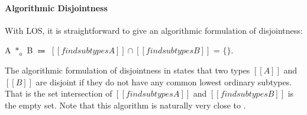\paragraph{Algorithmic Disjointness}
With LOS, it is straightforward to give an algorithmic formulation of
disjointness:

\begin{definition}
\label{def:inter:ad}
  A $*_a$ B $\Coloneqq$  $ [[findsubtypes A]] \cap [[findsubtypes B]] $ = $\{\}$.
\end{definition}

\noindent The algorithmic formulation of disjointness in
 states that two
types $[[A]]$ and $[[B]]$ are disjoint
if they do not have any common lowest ordinary subtypes. That is the
set intersection of $[[findsubtypes A]]$ and $[[findsubtypes B]]$ is the empty set.
Note that this algorithm is naturally very close to .
